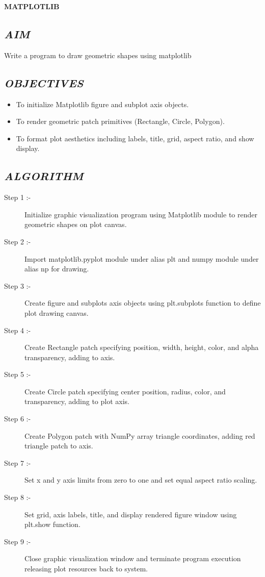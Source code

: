 \documentclass[11pt,a4paper]{article}
\begin{document}
\vspace{0.2cm}
\begin{center}
{\Huge \textbf{\textcolor{navyblue}{MATPLOTLIB}}}
\end{center}
\vspace{0.3cm}

\subsection*{\textit{AIM}}
Write a program to draw geometric shapes using matplotlib

\subsection*{\textit{OBJECTIVES}}
\begin{itemize}
  \item To initialize Matplotlib figure and subplot axis objects.
  \item To render geometric patch primitives (Rectangle, Circle, Polygon).
  \item To format plot aesthetics including labels, title, grid, aspect ratio, and show display.
\end{itemize}

\subsection*{\textit{ALGORITHM}}
\begin{description}
  \item[Step 1 :-] Initialize graphic visualization program using Matplotlib module to render geometric shapes on plot canvas.
  \item[Step 2 :-] Import matplotlib.pyplot module under alias plt and numpy module under alias np for drawing.
  \item[Step 3 :-] Create figure and subplots axis objects using plt.subplots function to define plot drawing canvas.
  \item[Step 4 :-] Create Rectangle patch specifying position, width, height, color, and alpha transparency, adding to axis.
  \item[Step 5 :-] Create Circle patch specifying center position, radius, color, and transparency, adding to plot axis.
  \item[Step 6 :-] Create Polygon patch with NumPy array triangle coordinates, adding red triangle patch to axis.
  \item[Step 7 :-] Set x and y axis limits from zero to one and set equal aspect ratio scaling.
  \item[Step 8 :-] Set grid, axis labels, title, and display rendered figure window using plt.show function.
  \item[Step 9 :-] Close graphic visualization window and terminate program execution releasing plot resources back to system.
\end{description}
\end{document}
